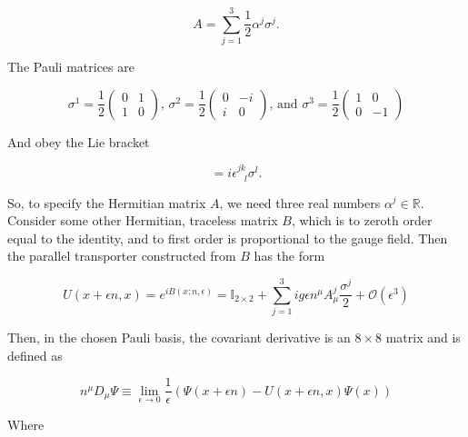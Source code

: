 \documentclass[10pt]{article}
\begin{document}
\begin{equation}
A = \sum_{j=1}^3 \frac{1}{2} \alpha^j \sigma^j.
\end{equation}

\noindent The Pauli matrices are

\begin{equation}
\sigma^1 = \frac{1}{2} \left( \begin{array}{cc}  0 & 1 \\ 1 & 0 \end{array} \right) 
\text{, } 
\sigma^2 = \frac{1}{2} \left( \begin{array}{cc} 0 & -i \\ i & 0 \end{array} \right) 
\text{, and } 
\sigma^3 = \frac{1}{2} \left( \begin{array}{cc}  1 & 0 \\ 0 & -1 \end{array} \right)
\end{equation}

\noindent And obey the Lie bracket

\begin{equation}
[ \sigma^j, \sigma^k] = i \epsilon^{jk}_{\,\,\,\,\,l} \sigma^l .
\end{equation}

\noindent So, to specify the Hermitian matrix $A$, we need three real numbers $\alpha^j \in \mathbb{R}$. \\

\noindent Consider some other Hermitian, traceless matrix $B$, which is to zeroth order equal to the identity, and to first order is proportional to the gauge field. Then the parallel transporter constructed from $B$ has the form

\begin{equation}
U(x + \epsilon n , x) = e^{i B(x;n,\epsilon)} = \mathbb{I}_{2\times 2} + \sum_{j=1}^3 i g \epsilon n^\mu A_\mu^j \frac{\sigma^j}{2} + \mathcal{O}(\epsilon^3)
\end{equation}

\noindent Then, in the chosen Pauli basis, the covariant derivative is an $8 \times 8$ matrix and is defined as

\begin{equation}
n^\mu D_\mu \Psi \equiv \lim_{\epsilon \rightarrow 0} \frac{1}{\epsilon} ( \Psi (x + \epsilon n) - U(x + \epsilon n, x) \Psi (x) )
\end{equation}

\noindent Where
\end{document}
